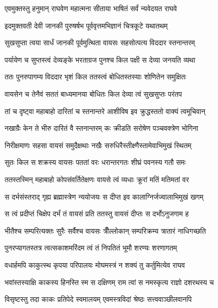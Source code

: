 
\twolineshloka
{एवमुक्तस्तु हनुमान् राघवेण महात्मना}
{सीताया भाषितं सर्वं न्यवेदयत राघवे} %

\twolineshloka
{इदमुक्तवती देवी जानकी पुरुषर्षभ}
{पूर्ववृत्तमभिज्ञानं चित्रकूटे यथातथम्} %

\twolineshloka
{सुखसुप्ता त्वया सार्धं जानकी पूर्वमुत्थिता}
{वायसः सहसोत्पत्य विददार स्तनान्तरम्} %

\twolineshloka
{पर्यायेण च सुप्तस्त्वं देव्यङ्के भरताग्रज}
{पुनश्च किल पक्षी स देव्या जनयति व्यथा} %

\twolineshloka
{ततः पुनरुपागम्य विददार भृशं किल}
{ततस्त्वं बोधितस्तस्याः शोणितेन समुक्षितः} %

\twolineshloka
{वायसेन च तेनैवं सततं बाध्यमानया}
{बोधितः किल देव्या त्वं सुखसुप्तः परंतप} %

\twolineshloka
{तां च दृष्ट्वा महाबाहो दारितां च स्तनान्तरे}
{आशीविष इव क्रुद्धस्ततो वाक्यं त्वमूचिवान्} %

\twolineshloka
{नखाग्रैः केन ते भीरु दारितं वै स्तनान्तरम्}
{कः क्रीडति सरोषेण पञ्चवक्त्रेण भोगिना} %

\twolineshloka
{निरीक्षमाणः सहसा वायसं समुदैक्षथाः}
{नखैः सरुधिरैस्तीक्ष्णैस्तामेवाभिमुखं स्थितम्} %

\twolineshloka
{सुतः किल स शक्रस्य वायसः पततां वरः}
{धरान्तरगतः शीघ्रं पवनस्य गतौ समः} %

\twolineshloka
{ततस्तस्मिन् महाबाहो कोपसंवर्तितेक्षणः}
{वायसे त्वं व्यधाः क्रूरां मतिं मतिमतां वर} %

\twolineshloka
{स दर्भसंस्तराद् गृह्य ब्रह्मास्त्रेण न्ययोजयः}
{स दीप्त इव कालाग्निर्जज्वालाभिमुखं खगम्} %

\twolineshloka
{स त्वं प्रदीप्तं चिक्षेप दर्भं तं वायसं प्रति}
{ततस्तु वायसं दीप्तः स दर्भोऽनुजगाम ह} %

\twolineshloka
{भीतैश्च सम्परित्यक्तः सुरैः सर्वैश्च वायसः}
{त्रीँल्लोकान् सम्परिक्रम्य त्रातारं नाधिगच्छति} %

\twolineshloka
{पुनरप्यागतस्तत्र त्वत्सकाशमरिंदम}
{त्वं तं निपतितं भूमौ शरण्यः शरणागतम्} %

\twolineshloka
{वधार्हमपि काकुत्स्थ कृपया परिपालयः}
{मोघमस्त्रं न शक्यं तु कर्तुमित्येव राघव} %

\twolineshloka
{भवांस्तस्याक्षि काकस्य हिनस्ति स्म स दक्षिणम्}
{राम त्वां स नमस्कृत्य राज्ञो दशरथस्य च} %

\twolineshloka
{विसृष्टस्तु तदा काकः प्रतिपेदे स्वमालयम्}
{एवमस्त्रविदां श्रेष्ठः सत्त्ववाञ्छीलवानपि} %

